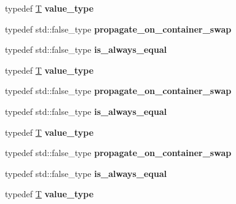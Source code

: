 \begin{DoxyCompactItemize}
\mbox{\label{structsome__alloc3_a859670f2c07ffe08a8b7c4fdc380b21f}} 
typedef \mbox{\hyperlink{struct_t}{T}} {\bfseries value\+\_\+type}
\item 
\mbox{\label{structsome__alloc3_a0ef9538889b4aeddeb81689c107f3455}} 
typedef std\+::false\+\_\+type {\bfseries propagate\+\_\+on\+\_\+container\+\_\+swap}
\item 
\mbox{\label{structsome__alloc3_a8507fb4590dc6d728bf639d9691af063}} 
typedef std\+::false\+\_\+type {\bfseries is\+\_\+always\+\_\+equal}
\item 
\mbox{\label{structsome__alloc3_a859670f2c07ffe08a8b7c4fdc380b21f}} 
typedef \mbox{\hyperlink{struct_t}{T}} {\bfseries value\+\_\+type}
\item 
\mbox{\label{structsome__alloc3_a0ef9538889b4aeddeb81689c107f3455}} 
typedef std\+::false\+\_\+type {\bfseries propagate\+\_\+on\+\_\+container\+\_\+swap}
\item 
\mbox{\label{structsome__alloc3_a8507fb4590dc6d728bf639d9691af063}} 
typedef std\+::false\+\_\+type {\bfseries is\+\_\+always\+\_\+equal}
\item 
\mbox{\label{structsome__alloc3_a859670f2c07ffe08a8b7c4fdc380b21f}} 
typedef \mbox{\hyperlink{struct_t}{T}} {\bfseries value\+\_\+type}
\item 
\mbox{\label{structsome__alloc3_a0ef9538889b4aeddeb81689c107f3455}} 
typedef std\+::false\+\_\+type {\bfseries propagate\+\_\+on\+\_\+container\+\_\+swap}
\item 
\mbox{\label{structsome__alloc3_a8507fb4590dc6d728bf639d9691af063}} 
typedef std\+::false\+\_\+type {\bfseries is\+\_\+always\+\_\+equal}
\item 
\mbox{\label{structsome__alloc3_a859670f2c07ffe08a8b7c4fdc380b21f}} 
typedef \mbox{\hyperlink{struct_t}{T}} {\bfseries value\+\_\+type}
\item 
\mbox{\label{structsome__alloc3_a0ef9538889b4aeddeb81689c107f3455}} 

\end{DoxyCompactItemize}
